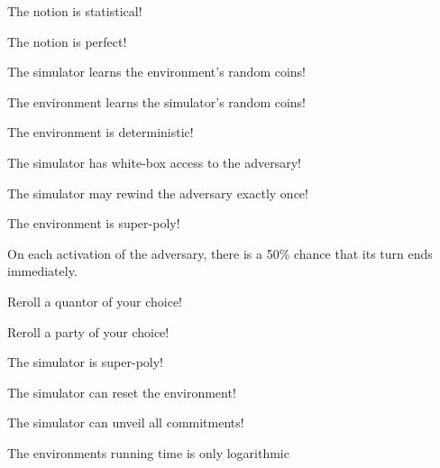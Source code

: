 \documentclass[avery5371,frame,grid]{flashcards}
\begin{document}
\begin{flashcard}{\ucftw}
  The notion is statistical!
  \stopcard
\end{flashcard}
\begin{flashcard}{\ucftw}
  The notion is perfect!
  \stopcard
\end{flashcard}
\begin{flashcard}{\ucftw}
  The simulator learns the environment's random coins!
  \stopcard
\end{flashcard}
\begin{flashcard}{\ucftw}
  The environment learns the simulator's random coins!
  \stopcard
\end{flashcard}
\begin{flashcard}{\ucftw}
  The environment is deterministic!
  \stopcard
\end{flashcard}
\begin{flashcard}{\ucftw}
  The simulator has white-box access to the adversary!
  \stopcard
\end{flashcard}
\begin{flashcard}{\ucftw}
  The simulator may rewind the adversary exactly once!
  \stopcard
\end{flashcard}
\begin{flashcard}{\ucftw}
  The environment is super-poly!
  \stopcard
\end{flashcard}
\begin{flashcard}{\ucftw}
  On each activation of the adversary, there is a 50\% chance that its turn ends immediately. 
  \stopcard
\end{flashcard}
\begin{flashcard}{\ucftw}
  Reroll a quantor of your choice!
  \stopcard
\end{flashcard}
\begin{flashcard}{\ucftw}
  Reroll a party of your choice!
  \stopcard
\end{flashcard}
\begin{flashcard}{\ucftw}
  The simulator is super-poly!
  \stopcard
\end{flashcard}
\begin{flashcard}{\ucftw}
  The simulator can reset the environment!
  \stopcard
\end{flashcard}
\begin{flashcard}{\ucftw}
  The simulator can unveil all commitments!
  \stopcard
\end{flashcard}
\begin{flashcard}{\ucftw}
  The environments running time is only logarithmic
  \stopcard
\end{flashcard}
\end{document}
